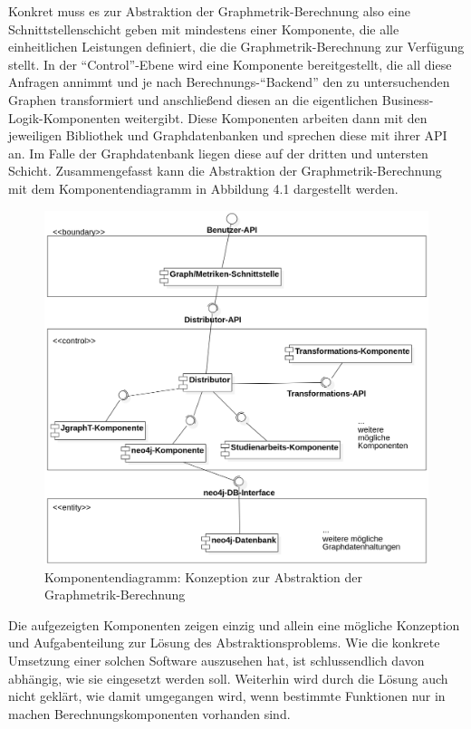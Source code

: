 \documentclass[a4paper,12pt,ngerman,chapterprefix=false,listof=totoc,bibliography=totoc]{scrreprt}
\begin{document}
{{{Konkret muss es zur Abstraktion der Graphmetrik-Berechnung also eine Schnittstellenschicht geben mit mindestens einer Komponente, die alle einheitlichen Leistungen definiert, die die Graphmetrik-Berechnung zur Verfügung stellt. In der "`Control"'-Ebene wird eine Komponente bereitgestellt, die all diese Anfragen annimmt und je nach Berechnungs-"`Backend"' den zu untersuchenden Graphen transformiert und anschließend diesen an die eigentlichen Business-Logik-Komponenten weitergibt. Diese Komponenten arbeiten dann mit den jeweiligen Bibliothek und Graphdatenbanken und sprechen diese mit ihrer API an. Im Falle der Graphdatenbank liegen diese auf der dritten und untersten Schicht. Zusammengefasst kann die Abstraktion der Graphmetrik-Berechnung mit dem Komponentendiagramm in Abbildung 4.1 dargestellt werden.
\begin{figure}[ht!]
	\centering
	\includegraphics[scale=.38]{Abbildungen/UML/component_abstraction.png}
	\caption[Komponentendiagramm: Konzeption zur Abstraktion der Graphmetrik-Berechnung]{Komponentendiagramm: Konzeption zur Abstraktion der Graphmetrik-Berechnung}
\end{figure}
Die aufgezeigten Komponenten zeigen einzig und allein eine mögliche Konzeption und Aufgabenteilung zur Lösung des Abstraktionsproblems. Wie die konkrete Umsetzung einer solchen Software auszusehen hat, ist schlussendlich davon abhängig, wie sie eingesetzt werden soll. Weiterhin wird durch die Lösung auch nicht geklärt, wie damit umgegangen wird, wenn bestimmte Funktionen nur in machen Berechnungskomponenten vorhanden sind.

}}}
\end{document}
